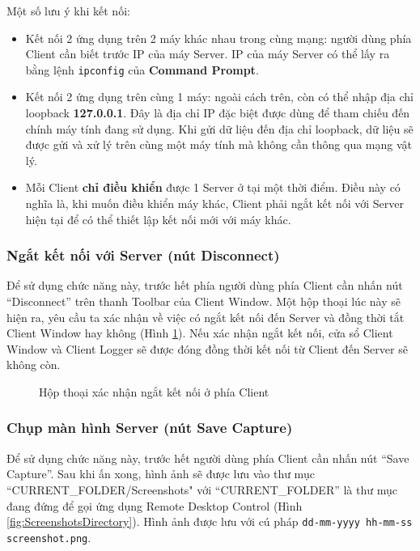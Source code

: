 Một số lưu ý khi kết nối:
\begin{itemize}
	\item  Kết nối 2 ứng dụng trên 2 máy khác nhau trong cùng mạng: người dùng phía Client cần biết trước IP của máy Server. IP của máy Server có thể lấy ra bằng lệnh \verb|ipconfig| của \textbf{Command Prompt}.
	\item Kết nối 2 ứng dụng trên cùng 1 máy: ngoài cách trên, còn có thể nhập địa chỉ loopback \textbf{127.0.0.1}. Đây là địa chỉ IP đặc biệt được dùng để tham chiếu đến chính máy tính đang sử dụng. Khi gửi dữ liệu đến địa chỉ loopback, dữ liệu sẽ được gửi và xử lý trên cùng một máy tính mà không cần thông qua mạng vật lý.
	\item Mỗi Client \textbf{chỉ điều khiển} được 1 Server ở tại một thời điểm. Điều này có nghĩa là, khi muốn điều khiển máy khác, Client phải ngắt kết nối với Server hiện tại để có thể thiết lập kết nối mới với máy khác.
\end{itemize}

\subsubsection{Ngắt kết nối với Server (nút Disconnect)}
Để sử dụng chức năng này, trước hết phía người dùng phía Client cần nhấn nút ``Disconnect'' trên thanh Toolbar của Client Window. Một hộp thoại lúc này sẽ hiện ra, yêu cầu ta xác nhận về việc có ngắt kết nối đến Server và đồng thời tắt Client Window hay không (Hình \ref{fig:ClientDisconnectDialog}). Nếu xác nhận ngắt kết nối, cửa sổ Client Window và Client Logger sẽ được đóng đồng thời kết nối từ Client đến Server sẽ không còn.

\begin{figure}[H]
	\caption{Hộp thoại xác nhận ngắt kết nối ở phía Client}
	\label{fig:ClientDisconnectDialog}
\end{figure}

\subsubsection{Chụp màn hình Server (nút Save Capture)}\label{subsubsec:saveCapture}
Để sử dụng chức năng này, trước hết người dùng phía Client cần nhấn nút ``Save Capture''. Sau khi ấn xong, hình ảnh sẽ được lưu vào thư mục ``CURRENT\_FOLDER\slash Screenshots" với ``CURRENT\_FOLDER'' là thư mục đang đứng để gọi ứng dụng Remote Desktop Control (Hình \ref{fig:ScreenshotsDirectory}). Hình ảnh được lưu với cú pháp \newline \noindent \verb|dd-mm-yyyy hh-mm-ss screenshot.png|. 

